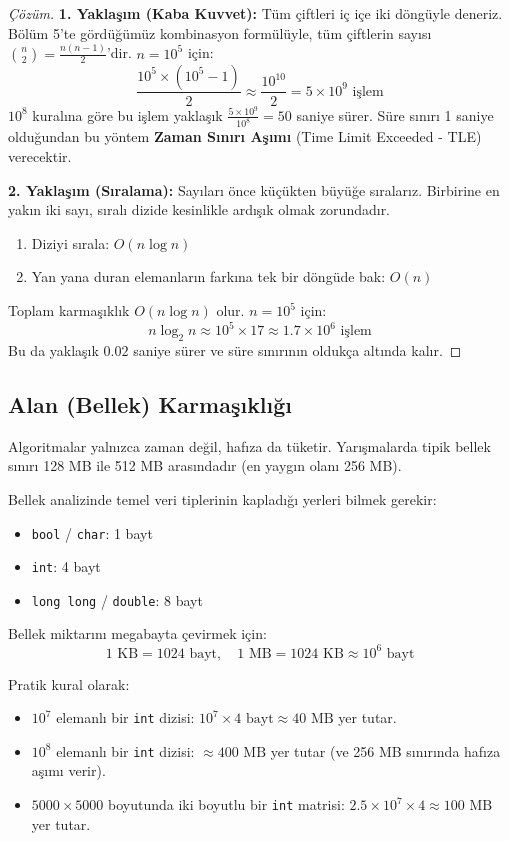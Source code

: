 \begin{proof}[Çözüm]
\textbf{1. Yaklaşım (Kaba Kuvvet):} Tüm çiftleri iç içe iki döngüyle deneriz. 
Bölüm 5'te gördüğümüz kombinasyon formülüyle, tüm çiftlerin sayısı $\binom{n}{2} = \frac{n(n-1)}{2}$'dir. 
$n = 10^5$ için:
\[ \frac{10^5 \times (10^5 - 1)}{2} \approx \frac{10^{10}}{2} = 5 \times 10^9 \text{ işlem} \]
$10^8$ kuralına göre bu işlem yaklaşık $\frac{5 \times 10^9}{10^8} = 50$ saniye sürer. Süre sınırı 1 saniye olduğundan bu yöntem \textbf{Zaman Sınırı Aşımı} (Time Limit Exceeded - TLE) verecektir.

\textbf{2. Yaklaşım (Sıralama):} Sayıları önce küçükten büyüğe sıralarız. Birbirine en yakın iki sayı, sıralı dizide kesinlikle ardışık olmak zorundadır.
\begin{enumerate}
    \item Diziyi sırala: $O(n \log n)$
    \item Yan yana duran elemanların farkına tek bir döngüde bak: $O(n)$
\end{enumerate}
Toplam karmaşıklık $O(n \log n)$ olur. $n = 10^5$ için:
\[ n \log_2 n \approx 10^5 \times 17 \approx 1.7 \times 10^6 \text{ işlem} \]
Bu da yaklaşık $0.02$ saniye sürer ve süre sınırının oldukça altında kalır.
\end{proof}

\subsection{Alan (Bellek) Karmaşıklığı}

Algoritmalar yalnızca zaman değil, hafıza da tüketir. Yarışmalarda tipik bellek sınırı 128 MB ile 512 MB arasındadır (en yaygın olanı 256 MB).

Bellek analizinde temel veri tiplerinin kapladığı yerleri bilmek gerekir:
\begin{itemize}
    \item \texttt{bool} / \texttt{char}: 1 bayt
    \item \texttt{int}: 4 bayt
    \item \texttt{long long} / \texttt{double}: 8 bayt
\end{itemize}

Bellek miktarını megabayta çevirmek için:
\[ 1 \text{ KB} = 1024 \text{ bayt}, \quad 1 \text{ MB} = 1024 \text{ KB} \approx 10^6 \text{ bayt} \]

Pratik kural olarak:
\begin{itemize}
    \item $10^7$ elemanlı bir \texttt{int} dizisi: $10^7 \times 4 \text{ bayt} \approx 40 \text{ MB}$ yer tutar.
    \item $10^8$ elemanlı bir \texttt{int} dizisi: $\approx 400 \text{ MB}$ yer tutar (ve 256 MB sınırında hafıza aşımı verir).
    \item $5000 \times 5000$ boyutunda iki boyutlu bir \texttt{int} matrisi: $2.5 \times 10^7 \times 4 \approx 100 \text{ MB}$ yer tutar.
\end{itemize}

